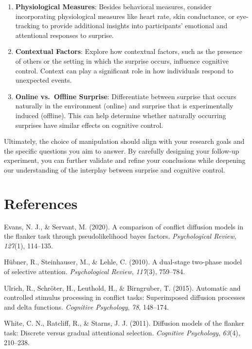 \documentclass[
  man]{apa7}
\newlength{\cslhangindent}
\newlength{\cslentryspacingunit} %
\newenvironment{CSLReferences}[2] %
 {%
  \setlength{\parindent}{0pt}
  \ifodd #1
  \let\oldpar\par
  \def\par{\hangindent=\cslhangindent\oldpar}
  \fi
  \setlength{\parskip}{#2\cslentryspacingunit}
 }%
 {}
\begin{document}
\begin{enumerate}
\item
  \textbf{Physiological Measures}: Besides behavioral measures, consider incorporating physiological measures like heart rate, skin conductance, or eye-tracking to provide additional insights into participants' emotional and attentional responses to surprise.
\item
  \textbf{Contextual Factors}: Explore how contextual factors, such as the presence of others or the setting in which the surprise occurs, influence cognitive control. Context can play a significant role in how individuals respond to unexpected events.
\item
  \textbf{Online vs.~Offline Surprise}: Differentiate between surprise that occurs naturally in the environment (online) and surprise that is experimentally induced (offline). This can help determine whether naturally occurring surprises have similar effects on cognitive control.
\end{enumerate}

Ultimately, the choice of manipulation should align with your research goals and the specific questions you aim to answer. By carefully designing your follow-up experiment, you can further validate and refine your conclusions while deepening our understanding of the interplay between surprise and cognitive control.

\newpage

\hypertarget{references}{%
\section{References}\label{references}}

\hypertarget{refs}{}
\begin{CSLReferences}{1}{0}
\leavevmode{}%
Evans, N. J., \& Servant, M. (2020). A comparison of conflict diffusion models in the flanker task through pseudolikelihood bayes factors. \emph{Psychological Review}, \emph{127}(1), 114--135.

\leavevmode{}%
Hübner, R., Steinhauser, M., \& Lehle, C. (2010). A dual-stage two-phase model of selective attention. \emph{Psychological Review}, \emph{117}(3), 759--784.

\leavevmode{}%
Ulrich, R., Schröter, H., Leuthold, H., \& Birngruber, T. (2015). Automatic and controlled stimulus processing in conflict tasks: Superimposed diffusion processes and delta functions. \emph{Cognitive Psychology}, \emph{78}, 148--174.

\leavevmode{}%
White, C. N., Ratcliff, R., \& Starns, J. J. (2011). Diffusion models of the flanker task: Discrete versus gradual attentional selection. \emph{Cognitive Psychology}, \emph{63}(4), 210--238.

\end{CSLReferences}
\end{document}
